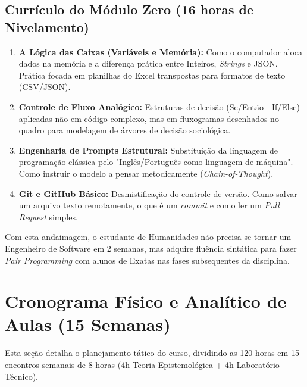 \documentclass[12pt,a4paper]{article}
\begin{document}
\subsection{Currículo do Módulo Zero (16 horas de Nivelamento)}
\begin{enumerate}
    \item \textbf{A Lógica das Caixas (Variáveis e Memória):} Como o computador aloca dados na memória e a diferença prática entre Inteiros, \textit{Strings} e JSON. Prática focada em planilhas do Excel transpostas para formatos de texto (CSV/JSON).
    \item \textbf{Controle de Fluxo Analógico:} Estruturas de decisão (Se/Então - If/Else) aplicadas não em código complexo, mas em fluxogramas desenhados no quadro para modelagem de árvores de decisão sociológica.
    \item \textbf{Engenharia de Prompts Estrutural:} Substituição da linguagem de programação clássica pelo "Inglês/Português como linguagem de máquina". Como instruir o modelo a pensar metodicamente (\textit{Chain-of-Thought}).
    \item \textbf{Git e GitHub Básico:} Desmistificação do controle de versão. Como salvar um arquivo texto remotamente, o que é um \textit{commit} e como ler um \textit{Pull Request} simples.
\end{enumerate}
Com esta andaimagem, o estudante de Humanidades não precisa se tornar um Engenheiro de Software em 2 semanas, mas adquire fluência sintática para fazer \textit{Pair Programming} com alunos de Exatas nas fases subsequentes da disciplina.

\newpage
\section{Cronograma Físico e Analítico de Aulas (15 Semanas)}

Esta seção detalha o planejamento tático do curso, dividindo as 120 horas em 15 encontros semanais de 8 horas (4h Teoria Epistemológica + 4h Laboratório Técnico).
\end{document}
